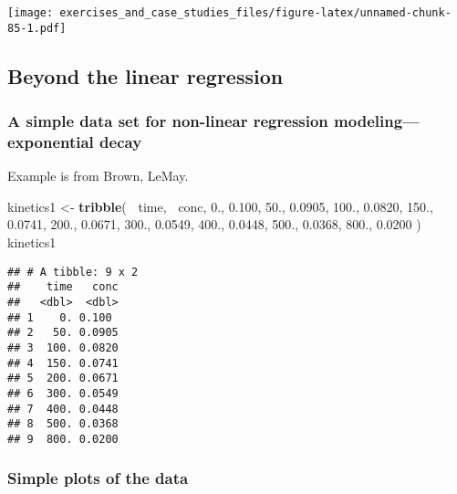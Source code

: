 \documentclass[]{book}
\newenvironment{Shaded}{\begin{snugshade}}{\end{snugshade}}
\newcommand{\FloatTok}[1]{\textcolor[rgb]{0.00,0.00,0.81}{#1}}
\newcommand{\KeywordTok}[1]{\textcolor[rgb]{0.13,0.29,0.53}{\textbf{#1}}}
\newcommand{\NormalTok}[1]{#1}
\newcommand{\OperatorTok}[1]{\textcolor[rgb]{0.81,0.36,0.00}{\textbf{#1}}}
\newcommand{\StringTok}[1]{\textcolor[rgb]{0.31,0.60,0.02}{#1}}
\theoremstyle{definition}
\theoremstyle{definition}
\theoremstyle{definition}
\theoremstyle{remark}
\begin{document}
\texttt{[image: exercises\_and\_case\_studies\_files/figure-latex/unnamed-chunk-85-1.pdf]}

\hypertarget{beyond-the-linear-regression}{%
\subsection{Beyond the linear
regression}\label{beyond-the-linear-regression}}

\hypertarget{a-simple-data-set-for-non-linear-regression-modelingexponential-decay}{%
\subsubsection{A simple data set for non-linear regression
modeling---exponential
decay}\label{a-simple-data-set-for-non-linear-regression-modelingexponential-decay}}

Example is from Brown, LeMay.

\begin{Shaded}
\begin{Highlighting}[]
\NormalTok{kinetics1 <-}\StringTok{ }\KeywordTok{tribble}\NormalTok{(}
  \OperatorTok{~}\NormalTok{time, }\OperatorTok{~}\NormalTok{conc,}
  \FloatTok{0.}\NormalTok{, }\FloatTok{0.100}\NormalTok{,}
  \FloatTok{50.}\NormalTok{, }\FloatTok{0.0905}\NormalTok{,}
  \FloatTok{100.}\NormalTok{, }\FloatTok{0.0820}\NormalTok{,}
  \FloatTok{150.}\NormalTok{, }\FloatTok{0.0741}\NormalTok{,}
  \FloatTok{200.}\NormalTok{, }\FloatTok{0.0671}\NormalTok{,}
  \FloatTok{300.}\NormalTok{, }\FloatTok{0.0549}\NormalTok{,}
  \FloatTok{400.}\NormalTok{, }\FloatTok{0.0448}\NormalTok{,}
  \FloatTok{500.}\NormalTok{, }\FloatTok{0.0368}\NormalTok{,}
  \FloatTok{800.}\NormalTok{, }\FloatTok{0.0200}
\NormalTok{)}
\NormalTok{kinetics1}
\end{Highlighting}
\end{Shaded}

\begin{verbatim}
## # A tibble: 9 x 2
##    time   conc
##   <dbl>  <dbl>
## 1    0. 0.100 
## 2   50. 0.0905
## 3  100. 0.0820
## 4  150. 0.0741
## 5  200. 0.0671
## 6  300. 0.0549
## 7  400. 0.0448
## 8  500. 0.0368
## 9  800. 0.0200
\end{verbatim}

\hypertarget{simple-plots-of-the-data}{%
\subsubsection{Simple plots of the
data}\label{simple-plots-of-the-data}}
\end{document}
